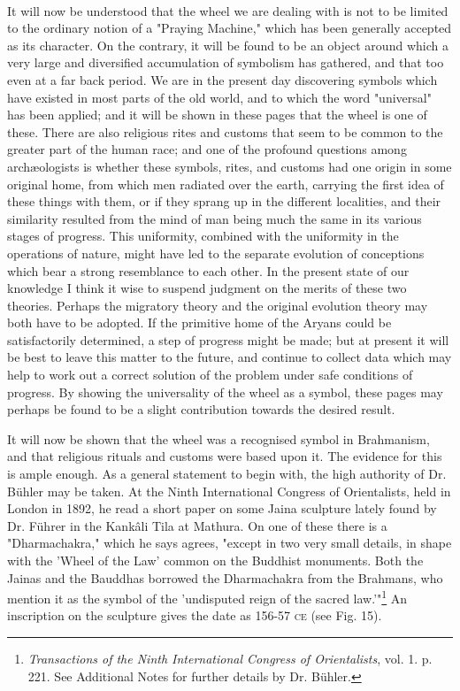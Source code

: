 \documentclass[a4paper, 11pt, oneside, polutonikogreek, english]{article}
\begin{document}
\paragraph{}
It will now be understood that the wheel we are dealing with is not to be limited to the ordinary notion of a "Praying Machine," which has been generally accepted as its character. On the contrary, it will be found to be an object around which a very large and diversified accumulation of symbolism has gathered, and that too even at a far back period. We are in the present day discovering symbols which have existed in most parts of the old world, and to which the word "universal" has been applied; and it will be shown in these pages that the wheel is one of these. There are also religious rites and customs that seem to be common to the greater part of the human race; and one of the profound questions among archæologists is whether these symbols, rites, and customs had one origin in some original home, from which men radiated over the earth, carrying the first idea of these things with them, or if they sprang up in the different localities, and their similarity resulted from the mind of man being much the same in its various stages of progress. This uniformity, combined with the uniformity in the operations of nature, might have led to the separate evolution of conceptions which bear a strong resemblance to each other. In the present state of our knowledge I think it wise to suspend judgment on the merits of these two theories. Perhaps the migratory theory and the original evolution theory may both have to be adopted. If the primitive home of the Aryans could be satisfactorily determined, a step of progress might be made; but at present it will be best to leave this matter to the future, and continue to collect data which may help to work out a correct solution of the problem under safe conditions of progress. By showing the universality of the wheel as a symbol, these pages may perhaps be found to be a slight contribution towards the desired result.

It will now be shown that the wheel was a recognised symbol in Brahmanism, and that religious rituals and customs were based upon it. The evidence for this is ample enough. As a general statement to begin with, the high authority of Dr. Bühler may be taken. At the Ninth International Congress of Orientalists, held in London in 1892, he read a short paper on some Jaina sculpture lately found by Dr. Führer in the Kankâli Tila at Mathura. On one of these there is a "Dharmachakra," which he says agrees, "except in two very small details, in shape with the 'Wheel of the Law' common on the Buddhist monuments. Both the Jainas and the Bauddhas borrowed the Dharmachakra from the Brahmans, who mention it as the symbol of the 'undisputed reign of the sacred law.'"\footnote{\emph{Transactions of the Ninth International Congress of Orientalists}, vol. 1. p. 221. See Additional Notes for further details by Dr. Bühler.} An inscription on the sculpture gives the date as 156-57 \textsc{ce} (see Fig. 15).
\end{document}
